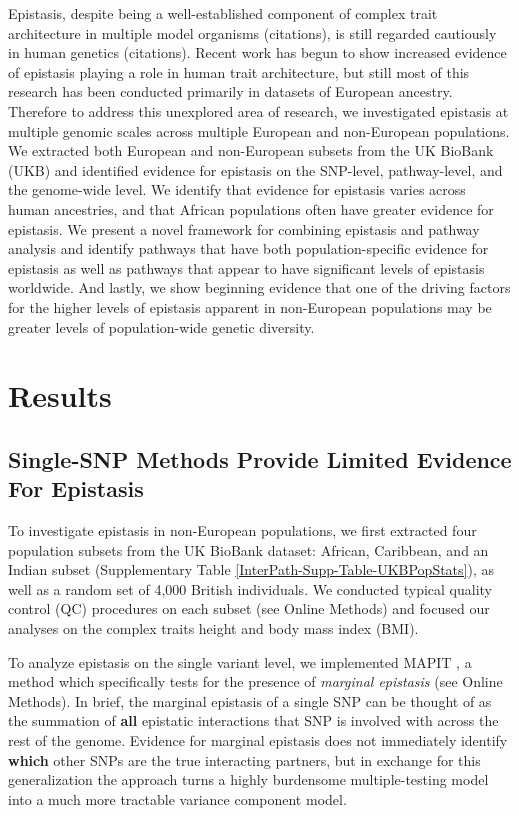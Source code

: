 \documentclass[12pt, a4paper]{article}
\begin{document}
Epistasis, despite being a well-established component of complex trait architecture in multiple model organisms (citations), is still regarded cautiously in human genetics (citations). Recent work has begun to show increased evidence of epistasis playing a role in human trait architecture, but still most of this research has been conducted primarily in datasets of European ancestry. Therefore to address this unexplored area of research, we investigated epistasis at multiple genomic scales across multiple European and non-European populations. We extracted both European and non-European subsets from the UK BioBank (UKB) \citep{Sudlow2015} and identified evidence for epistasis on the SNP-level, pathway-level, and the genome-wide level. We identify that evidence for epistasis varies across human ancestries, and that African populations often have greater evidence for epistasis. We present a novel framework for combining epistasis and pathway analysis and identify pathways that have both population-specific evidence for epistasis as well as pathways that appear to have significant levels of epistasis worldwide. And lastly, we show beginning evidence that one of the driving factors for the higher levels of epistasis apparent in non-European populations may be greater levels of population-wide genetic diversity.

\section{Results}\label{InterPath-Results}

\subsection{Single-SNP Methods Provide Limited Evidence For Epistasis}\label{InterPath-Results-SNPEpistasis}

To investigate epistasis in non-European populations, we first extracted four population subsets from the UK BioBank dataset: African, Caribbean, and an Indian subset (Supplementary Table \ref{InterPath-Supp-Table-UKBPopStats}), as well as a random set of 4,000 British individuals. We conducted typical quality control (QC) procedures on each subset (see Online Methods) and focused our analyses on the complex traits height and body mass index (BMI). 

To analyze epistasis on the single variant level, we implemented MAPIT \citep{Crawford2017}, a method which specifically tests for the presence of \textit{marginal epistasis} (see Online Methods). In brief, the marginal epistasis of a single SNP can be thought of as the summation of \textbf{all} epistatic interactions that SNP is involved with across the rest of the genome. Evidence for marginal epistasis does not immediately identify \textbf{which} other SNPs are the true interacting partners, but in exchange for this generalization the approach turns a highly burdensome multiple-testing model into a much more tractable variance component model.
\end{document}
